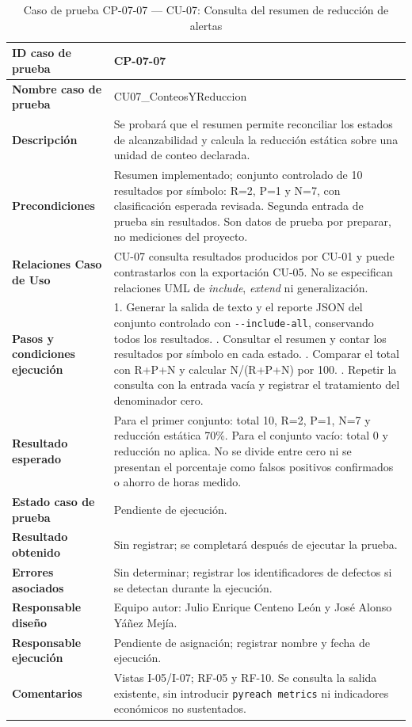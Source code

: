 \begin{table}[H]
\centering\small{}
\renewcommand{\arraystretch}{1.15}
\caption{Caso de prueba CP-07-07 --- CU-07: Consulta del resumen de reducción de alertas}
\label{p7:tab:cp07_07}
\begin{tabularx}{\textwidth}{|P{4.15cm}|Y|}
\hline
\textbf{ID caso de prueba} & CP-07-07 \\ \hline
\textbf{Nombre caso de prueba} & CU07\_\allowbreak ConteosYReduccion \\ \hline
\textbf{Descripción} & Se probará que el resumen permite reconciliar los estados de alcanzabilidad y calcula la reducción estática sobre una unidad de conteo declarada. \\ \hline
\textbf{Precondiciones} & Resumen implementado; conjunto controlado de 10 resultados por símbolo: R=2, P=1 y N=7, con clasificación esperada revisada. Segunda entrada de prueba sin resultados. Son datos de prueba por preparar, no mediciones del proyecto. \\ \hline
\textbf{Relaciones Caso de Uso} & CU-07 consulta resultados producidos por CU-01 y puede contrastarlos con la exportación CU-05. No se especifican relaciones UML de \textit{include}, \textit{extend} ni generalización. \\ \hline
\textbf{Pasos y condiciones ejecución} & 1. Generar la salida de texto y el reporte JSON del conjunto controlado con \texttt{-\allowbreak -\allowbreak include-\allowbreak all}, conservando todos los resultados. . Consultar el resumen y contar los resultados por símbolo en cada estado. . Comparar el total con R+P+N y calcular N/(R+P+N) por 100. . Repetir la consulta con la entrada vacía y registrar el tratamiento del denominador cero. \\ \hline
\textbf{Resultado esperado} & Para el primer conjunto: total 10, R=2, P=1, N=7 y reducción estática 70\%. Para el conjunto vacío: total 0 y reducción no aplica. No se divide entre cero ni se presentan el porcentaje como falsos positivos confirmados o ahorro de horas medido. \\ \hline
\textbf{Estado caso de prueba} & Pendiente de ejecución. \\ \hline
\textbf{Resultado obtenido} & Sin registrar; se completará después de ejecutar la prueba. \\ \hline
\textbf{Errores asociados} & Sin determinar; registrar los identificadores de defectos si se detectan durante la ejecución. \\ \hline
\textbf{Responsable diseño} & Equipo autor: Julio Enrique Centeno León y José Alonso Yáñez Mejía. \\ \hline
\textbf{Responsable ejecución} & Pendiente de asignación; registrar nombre y fecha de ejecución. \\ \hline
\textbf{Comentarios} & Vistas I-05/I-07; RF-05 y RF-10. Se consulta la salida existente, sin introducir \texttt{pyreach metrics} ni indicadores económicos no sustentados. \\ \hline
\end{tabularx}
\end{table}
\clearpage

